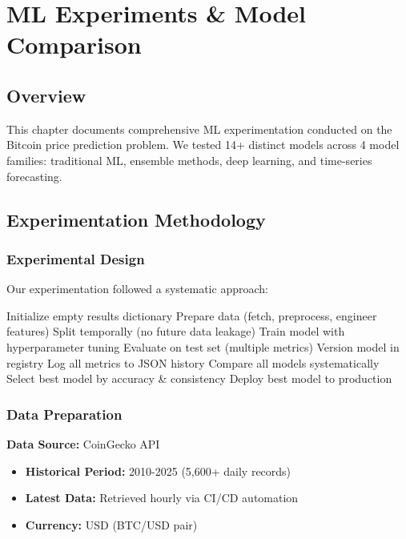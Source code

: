\chapter{ML Experiments \& Model Comparison}
\label{ch:ml_experiments}

\section{Overview}

This chapter documents comprehensive ML experimentation conducted on the Bitcoin price prediction problem. We tested 14+ distinct models across 4 model families: traditional ML, ensemble methods, deep learning, and time-series forecasting.

\section{Experimentation Methodology}

\subsection{Experimental Design}

Our experimentation followed a systematic approach:

\begin{algorithm}
\caption{Model Experimentation Process}
\begin{algorithmic}[1]
\State Initialize empty results dictionary
    \State Prepare data (fetch, preprocess, engineer features)
    \State Split temporally (no future data leakage)
    \State Train model with hyperparameter tuning
    \State Evaluate on test set (multiple metrics)
    \State Version model in registry
    \State Log all metrics to JSON history
\EndFor
\State Compare all models systematically
\State Select best model by accuracy \& consistency
\State Deploy best model to production
\end{algorithmic}
\end{algorithm}

\subsection{Data Preparation}

\textbf{Data Source:} CoinGecko API
\begin{itemize}
    \item \textbf{Historical Period:} 2010-2025 (5,600+ daily records)
    \item \textbf{Latest Data:} Retrieved hourly via CI/CD automation
    \item \textbf{Currency:} USD (BTC/USD pair)
\end{itemize}

